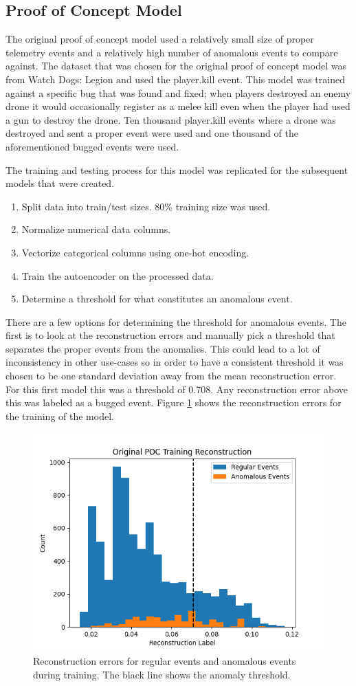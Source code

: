 \documentclass[a4paper,11pt]{article}
\begin{document}
\subsection{Proof of Concept Model}
The original proof of concept model used a relatively small size of proper telemetry events and a relatively high number of anomalous events to compare against. The dataset that was chosen for the original proof of concept model was from Watch Dogs: Legion and used the player.kill event. This model was trained against a specific bug that was found and fixed; when players destroyed an enemy drone it would occasionally register as a melee kill even when the player had used a gun to destroy the drone. Ten thousand player.kill events where a drone was destroyed and sent a proper event were used and one thousand of the aforementioned bugged events were used.
\par
The training and testing process for this model was replicated for the subsequent models that were created.
\begin{enumerate}
 \item Split data into train/test sizes. 80\% training size was used.
 \item Normalize numerical data columns.
 \item Vectorize categorical columns using one-hot encoding.
 \item Train the autoencoder on the processed data.
 \item Determine a threshold for what constitutes an anomalous event.
\end{enumerate}
There are a few options for determining the threshold for anomalous events. The first is to look at the reconstruction errors and manually pick a threshold that separates the proper events from the anomalies. This could lead to a lot of inconsistency in other use-cases so in order to have a consistent threshold it was chosen to be one standard deviation away from the mean reconstruction error. For this first model this was a threshold of 0.708. Any reconstruction error above this was labeled as a bugged event. Figure \ref{original_poc_training_reconstruction} shows the reconstruction errors for the training of the model.
\begin{figure}[H]
\centering
\includegraphics[width=.8\textwidth]{original_poc_training_reconstruction.png}
\caption{Reconstruction errors for regular events and anomalous events during training. The black line shows the anomaly threshold.}
\label{original_poc_training_reconstruction}
\end{figure}
\end{document}
